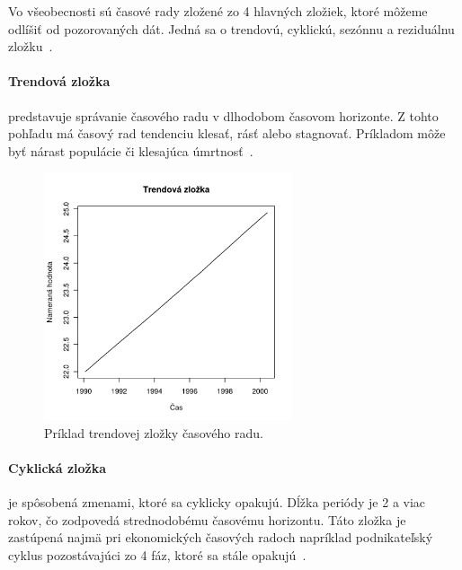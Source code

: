\documentclass[a4paper,slovak,12pt,appendix]{article}
\begin{document}
Vo všeobecnosti sú časové rady zložené zo 4 hlavných zložiek, ktoré môžeme
odlíšiť od pozorovaných dát. Jedná sa o trendovú, cyklickú, sezónnu
a reziduálnu zložku~\cite{Agrawal2013}.

\paragraph{Trendová zložka} predstavuje správanie časového radu v dlhodobom
časovom horizonte. Z tohto pohľadu má časový rad tendenciu klesať, rásť alebo
stagnovať. Príkladom môže byť nárast populácie či klesajúca
úmrtnosť~\cite{Agrawal2013}.

\begin{figure}[!ht]
  \centering
  \includegraphics[width=0.65\textwidth]{trend_component.pdf}
  \caption{Príklad trendovej zložky časového radu.}
  \label{fig-trend-comp}
\end{figure}

\paragraph{Cyklická zložka} je spôsobená zmenami, ktoré sa cyklicky opakujú.
Dĺžka periódy je 2 a viac rokov, čo zodpovedá strednodobému časovému horizontu.
Táto zložka je zastúpená najmä pri ekonomických časových radoch napríklad
podnikateľský cyklus pozostávajúci zo 4 fáz, ktoré sa stále
opakujú~\cite{Agrawal2013}.
\end{document}

